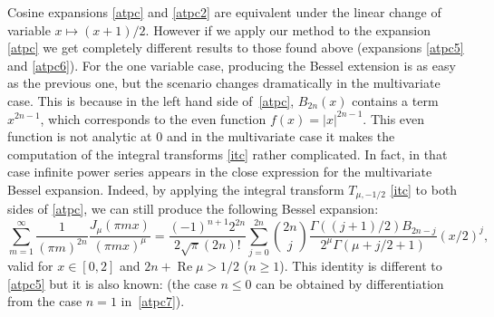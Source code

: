 \documentclass[12pt,leqno]{amsart}
\numberwithin{equation}{section}
\theoremstyle{plain}
\renewcommand{\Re}{\operatorname{Re}}
\begin{document}
Cosine expansions \eqref{atpc} and \eqref{atpc2} are equivalent under the linear change of variable $x \mapsto (x+1)/2$. However if we apply our method to the expansion \eqref{atpc} we get completely different results to those found above (expansions \eqref{atpc5} and \eqref{atpc6}). For the one variable case, producing the Bessel extension is as easy as the previous one, but the scenario changes dramatically in the multivariate case. This is because in the left hand side of~\eqref{atpc}, $B_{2n}(x)$ contains a term $x^{2n-1}$, which corresponds to the even function $f(x) = |x|^{2n-1}$. This even function is not analytic at $0$ and in the multivariate case it makes the computation of the integral transforms \eqref{itc} rather complicated. In fact, in that case infinite power series appears in the close expression for the multivariate Bessel expansion. Indeed, by applying the integral transform $T_{\mu,-1/2}$ \eqref{itc} to both sides of \eqref{atpc}, we can still produce the following Bessel expansion:
\begin{equation}
\label{atpc7}
\sum_{m=1}^{\infty} \frac{1}{(\pi m)^{2n}} \frac{J_\mu(\pi mx)}{(\pi mx)^\mu}
= \frac{(-1)^{n+1}2^{2n}}{2\sqrt \pi(2n)!} \sum_{j=0}^{2n} \binom{2n}{j}
\frac{\Gamma((j+1)/2)B_{2n-j}}{2^{\mu}\Gamma(\mu+j/2+1)}(x/2)^j,
\end{equation}
valid for $x\in [0,2]$ and $2n+\Re \mu>1/2$ ($n\ge 1$). This identity is different to \eqref{atpc5} but it is also known: \cite[p.~678, (13)]{PBM1}
(the case $n\le 0$ can be obtained by differentiation from the case $n=1$ in~\eqref{atpc7}).
\end{document}
